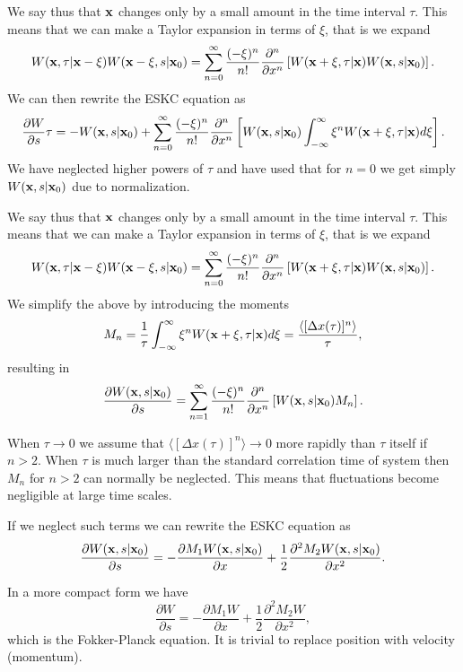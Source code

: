 We say thus that ${\bf x}$ changes only by a small amount in the time interval $\tau$. 
This means that we can make a Taylor expansion in terms of $\xi$, that is we
expand
\[
W({\bf x},\tau|{\bf x}-\xi)W({\bf x}-\xi,s|{\bf x}_0) =
\sum_{n=0}^{\infty}\frac{(-\xi)^n}{n!}\frac{\partial^n}{\partial x^n}\left[W({\bf x}+\xi,\tau|{\bf x})W({\bf x},s|{\bf x}_0)
\right].
\]
We can then rewrite the ESKC equation as 
\[
\frac{\partial W}{\partial s}\tau=-W({\bf x},s|{\bf x}_0)+
\sum_{n=0}^{\infty}\frac{(-\xi)^n}{n!}\frac{\partial^n}{\partial x^n}
\left[W({\bf x},s|{\bf x}_0)\int_{-\infty}^{\infty} \xi^nW({\bf x}+\xi,\tau|{\bf x})d\xi\right].
\]
We have neglected higher powers of $\tau$ and have used that for $n=0$ 
we get simply $W({\bf x},s|{\bf x}_0)$ due to normalization.

We say thus that ${\bf x}$ changes only by a small amount in the time interval $\tau$. 
This means that we can make a Taylor expansion in terms of $\xi$, that is we
expand
\[
W({\bf x},\tau|{\bf x}-\xi)W({\bf x}-\xi,s|{\bf x}_0) =
\sum_{n=0}^{\infty}\frac{(-\xi)^n}{n!}\frac{\partial^n}{\partial x^n}\left[W({\bf x}+\xi,\tau|{\bf x})W({\bf x},s|{\bf x}_0)
\right].
\]
We simplify the above by introducing the moments 
\[
M_n=\frac{1}{\tau}\int_{-\infty}^{\infty} \xi^nW({\bf x}+\xi,\tau|{\bf x})d\xi=
\frac{\langle [\Delta x(\tau)]^n\rangle}{\tau},
\]
resulting in
\[
\frac{\partial W({\bf x},s|{\bf x}_0)}{\partial s}=
\sum_{n=1}^{\infty}\frac{(-\xi)^n}{n!}\frac{\partial^n}{\partial x^n}
\left[W({\bf x},s|{\bf x}_0)M_n\right].
\]

When $\tau \rightarrow 0$ we assume that $\langle [\Delta x(\tau)]^n\rangle \rightarrow 0$ more rapidly than $\tau$ itself if $n > 2$. 
When $\tau$ is much larger than the standard correlation time of 
system then $M_n$ for $n > 2$ can normally be neglected.
This means that fluctuations become negligible at large time scales.

If we neglect such terms we can rewrite the ESKC equation as 
\[
\frac{\partial W({\bf x},s|{\bf x}_0)}{\partial s}=
-\frac{\partial M_1W({\bf x},s|{\bf x}_0)}{\partial x}+
\frac{1}{2}\frac{\partial^2 M_2W({\bf x},s|{\bf x}_0)}{\partial x^2}.
\]

In a more compact form we have
\[
\frac{\partial W}{\partial s}=
-\frac{\partial M_1W}{\partial x}+
\frac{1}{2}\frac{\partial^2 M_2W}{\partial x^2},
\]
which is the Fokker-Planck equation.  It is trivial to replace 
position with velocity (momentum).
